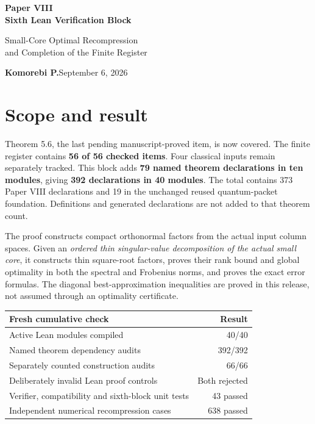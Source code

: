 \documentclass[11pt]{article}
\begin{document}
{\LARGE\bfseries\color{ink} Paper VIII\\[3pt] Sixth Lean Verification Block}\par
{\large Small-Core Optimal Recompression\\and Completion of the Finite Register}\par
\textbf{Komorebi P.}\hfill September 6, 2026

\section*{\color{ink}Scope and result}
Theorem 5.6, the last pending manuscript-proved item, is now covered. The finite register contains \textbf{56 of 56 checked items}. Four classical inputs remain separately tracked. This block adds \textbf{79 named theorem declarations in ten modules}, giving \textbf{392 declarations in 40 modules}. The total contains 373 Paper VIII declarations and 19 in the unchanged reused quantum-packet foundation. Definitions and generated declarations are not added to that theorem count.

The proof constructs compact orthonormal factors from the actual input column spaces. Given an \emph{ordered thin singular-value decomposition of the actual small core}, it constructs thin square-root factors, proves their rank bound and global optimality in both the spectral and Frobenius norms, and proves the exact error formulas. The diagonal best-approximation inequalities are proved in this release, not assumed through an optimality certificate.

\begin{center}\small
\renewcommand{\arraystretch}{1.22}
\begin{tabular}{@{}p{}r@{}}
\toprule
Fresh cumulative check & Result\\
\midrule
Active Lean modules compiled & 40/40\\
Named theorem dependency audits & 392/392\\
Separately counted construction audits & 66/66\\
Deliberately invalid Lean proof controls & Both rejected\\
Verifier, compatibility and sixth-block unit tests & 43 passed\\
Independent numerical recompression cases & 638 passed\\
\bottomrule
\end{tabular}
\end{center}
\end{document}
